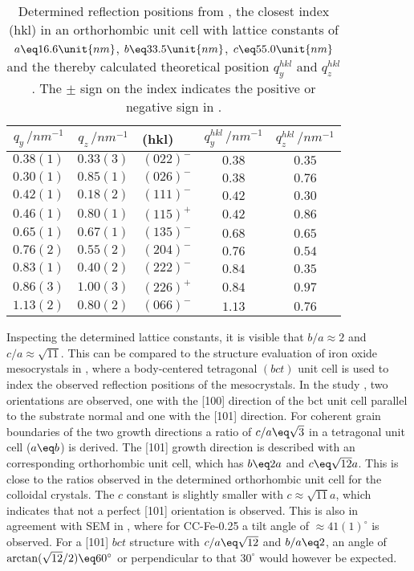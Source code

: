 \documentclass[\main/dresen_thesis.tex]{subfiles}
\begin{document}
  \begin{table}[!htbp]
    \centering
    \caption{\label{tab:colloidalCrystals:gisaxs:reflections}Determined reflection positions from , the closest index (hkl) in an orthorhombic unit cell with lattice constants of $a \eq 16.6 \unit{nm}$, $b \eq 33.5 \unit{nm}$, $c \eq 55.0 \unit{nm}$ and the thereby calculated theoretical position $q^{hkl}_y$ and $q^{hkl}_z$. The $\pm$ sign on the index indicates the positive or negative sign in .}
    \begin{tabular}{ c | c | l | c | c}
      $q_y\,/ \unit{nm^{-1}}$ & $q_z\, / \unit{nm^{-1}}$ & (hkl) & $q^{hkl}_y\,/ \unit{nm^{-1}}$ & $q^{hkl}_z\,/ \unit{nm^{-1}}$\\
      \hline
      $0.38(1)$ & $0.33(3)$ & $(022)^{-}$ & $0.38$ & $0.35$\\
      $0.30(1)$ & $0.85(1)$ & $(026)^{-}$ & $0.38$ & $0.76$\\
      $0.42(1)$ & $0.18(2)$ & $(111)^{-}$ & $0.42$ & $0.30$\\
      $0.46(1)$ & $0.80(1)$ & $(115)^{+}$ & $0.42$ & $0.86$\\
      $0.65(1)$ & $0.67(1)$ & $(135)^{-}$ & $0.68$ & $0.65$\\
      $0.76(2)$ & $0.55(2)$ & $(204)^{-}$ & $0.76$ & $0.54$\\
      $0.83(1)$ & $0.40(2)$ & $(222)^{-}$ & $0.84$ & $0.35$\\
      $0.86(3)$ & $1.00(3)$ & $(226)^{+}$ & $0.84$ & $0.97$\\
      $1.13(2)$ & $0.80(2)$ & $(066)^{-}$ & $1.13$ & $0.76$\\
      \hline
    \end{tabular}
  \end{table}

  Inspecting the determined lattice constants, it is visible that $b/a \approx 2$ and $c/a \approx \sqrt{11}$.
  This can be compared to the structure evaluation of iron oxide mesocrystals in \cite{Wetterskog_2016_Tunin}, where a body-centered tetragonal $(bct)$ unit cell is used to index the observed reflection positions of the mesocrystals.
  In the study \cite{Wetterskog_2016_Tunin}, two orientations are observed, one with the [100] direction of the bct unit cell parallel to the substrate normal and one with the [101] direction.
  For coherent grain boundaries of the two growth directions a ratio of $c/a \eq \sqrt{3}$ in a tetragonal unit cell ($a \eq b$) is derived.
  The [101] growth direction is described with an corresponding orthorhombic unit cell, which has $b \eq 2 a$ and $c \eq \sqrt{12} a$.
  This is close to the ratios observed in the determined orthorhombic unit cell for the colloidal crystals.
  The $c$ constant is slightly smaller with $c \approx \sqrt{11} a$, which indicates that not a perfect [101] orientation is observed.
  This is also in agreement with SEM in , where for CC-Fe-0.25 a tilt angle of $\approx 41(1) ^\circ$ is observed.
  For a [101] $bct$ structure with $c/a \eq \sqrt{12}$ and $b/a \eq 2$, an angle of $\arctan(\sqrt{12}/2) \eq 60 ^\circ$ or perpendicular to that $30^\circ$ would however be expected.
\end{document}
